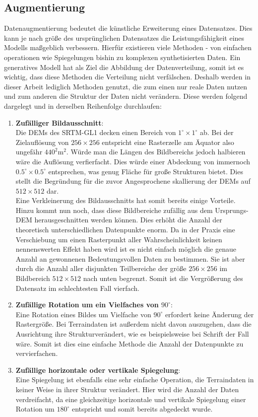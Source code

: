 \subsection{Augmentierung}
\label{subsec:Augmentierung}

Datenaugmentierung bedeutet die künstliche Erweiterung eines Datensatzes. Dies kann je nach größe des ursprünglichen Datensatzes die Leistungsfähigkeit eines Modells maßgeblich verbessern. Hierfür existieren viele Methoden - von einfachen operationen wie Spiegelungen bishin zu komplexen synthetisierten Daten. Ein generatives Modell hat als Ziel die Abbildung der Datenverteilung, somit ist es wichtig, dass diese Methoden die Verteilung nicht verfälschen. Deshalb werden in dieser Arbeit lediglich Methoden genutzt, die zum einen nur reale Daten nutzen und zum anderen die Struktur der Daten nicht verändern. Diese werden folgend dargelegt und in derselben Reihenfolge durchlaufen:
\begin{enumerate}
    \item \textbf{Zufälliger Bildausschnitt}: \\
    Die DEMs des SRTM-GL1 decken einen Bereich von $1^{\circ}\times1^{\circ}$ ab. Bei der Zielauflösung von $256\times256$ entspricht eine Rasterzelle am Äquator also ungefähr $440^2\text{m}^2$. Würde man die Längen des Bildbereichs jedoch halbieren wäre die Auflösung verfierfacht. Dies würde einer Abdeckung von immernoch $0.5^{\circ}\times0.5^{\circ}$ entsprechen, was genug Fläche für große Strukturen bietet. Dies stellt die Begründung für die zuvor Angesprochene skallierung der DEMs auf $512\times512$ dar. \\ 
    Eine Verkleinerung des Bildausschnitts hat somit bereits einige Vorteile. Hinzu kommt nun noch, dass diese Bildbereiche zufällig aus dem Ursprungs-DEM herausgeschnitten werden können. Dies erhöht die Anzahl der theoretisch unterschiedlichen Datenpunkte enorm. Da in der Praxis eine Verschiebung um einen Rasterpunkt aller Wahrscheinlichkeit keinen nennenswerten Effekt haben wird ist es nicht einfach möglich die genaue Anzahl an gewonnenen Bedeutungsvollen Daten zu bestimmen. Sie ist aber durch die Anzahl aller disjunkten Teilbereiche der größe $256\times256$ im Bildbereich $512\times512$ nach unten begrenzt. Somit ist die Vergrößerung des Datensatz im schlechtesten Fall vierfach.
    \item \textbf{Zufällige Rotation um ein Vielfaches von $90^{\circ}$}: \\
    Eine Rotation eines Bildes um Vielfache von $90^{\circ}$ erfordert keine Änderung der Rastergröße. Bei Terraindaten ist außerdem nicht davon auszugehen, dass die Ausrichtung ihre Strukturverändert, wie es beispielsweise bei Schrift der Fall wäre. Somit ist dies eine einfache Methode die Anzahl der Datenpunkte zu vervierfachen.
    \item \textbf{Zufällige horizontale oder vertikale Spiegelung}: \\
    Eine Spiegelung ist ebenfalls eine sehr einfache Operation, die Terraindaten in keiner Weise in ihrer Struktur verändert. Hier wird die Anzahl der Daten verdreifacht, da eine gleichzeitige horizontale und vertikale Spiegelung einer Rotation um $180^{\circ}$ entspricht und somit bereits abgedeckt wurde. 
\end{enumerate}
